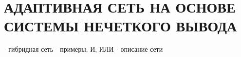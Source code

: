 \section[Адаптивная сеть на основе системы нечеткого вывода]{%
  АДАПТИВНАЯ СЕТЬ НА ОСНОВЕ СИСТЕМЫ НЕЧЕТКОГО ВЫВОДА
}

- гибридная сеть
- примеры: И, ИЛИ
- описание сети





